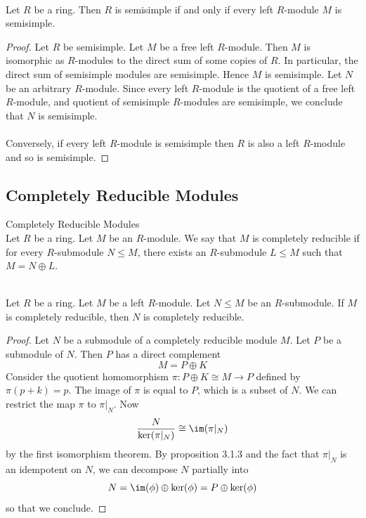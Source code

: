 \documentclass[a4paper]{article}
\begin{document}
\begin{prp}{}{}\\
Let $R$ be a ring. Then $R$ is semisimple if and only if every left $R$-module $M$ is semisimple. 
\begin{proof}
Let $R$ be semisimple. Let $M$ be a free left $R$-module. Then $M$ is isomorphic as $R$-modules to the direct sum of some copies of $R$. In particular, the direct sum of semisimple modules are semisimple. Hence $M$ is semisimple. Let $N$ be an arbitrary $R$-module. Since every left $R$-module is the quotient of a free left $R$-module, and quotient of semisimple $R$-modules are semisimple, we conclude that $N$ is semisimple. \\~\\

Conversely, if every left $R$-module is semisimple then $R$ is also a left $R$-module and so is semisimple. 
\end{proof}
\end{prp}

\subsection{Completely Reducible Modules}
\begin{defn}{Completely Reducible Modules}{}\\
Let $R$ be a ring. Let $M$ be an $R$-module. We say that $M$ is completely reducible if for every $R$-submodule $N\leq M$, there exists an $R$-submodule $L\leq M$ such that $M=N\oplus L$. 
\end{defn}

\begin{lmm}{}{}\\
Let $R$ be a ring. Let $M$ be a left $R$-module. Let $N\leq M$ be an $R$-submodule. If $M$ is completely reducible, then $N$ is completely reducible. 
\begin{proof}
Let $N$ be a submodule of a completely reducible module $M$. Let $P$ be a submodule of $N$. Then $P$ has a direct complement $$M=P\oplus K$$ Consider the quotient homomorphism $\pi:P\oplus K\cong M\to P$ defined by $\pi(p+k)=p$. The image of $\pi$ is equal to $P$, which is a subset of $N$. We can restrict the map $\pi$ to $\pi|_N$. Now $$\frac{N}{\ker(\pi|_N)}\cong\im(\pi|_N)$$ by the first isomorphism theorem. By proposition 3.1.3 and the fact that $\pi|_N$ is an idempotent on $N$, we can decompose $N$ partially into $$N=\im(\phi)\oplus\ker(\phi)=P\oplus\ker(\phi)$$ so that we conclude. 
\end{proof}
\end{lmm}
\end{document}
